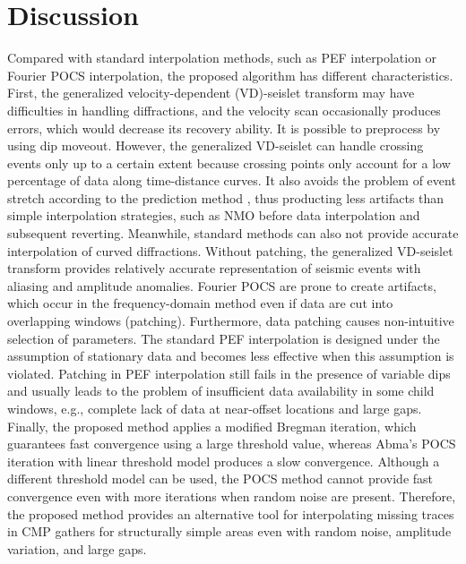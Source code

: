 
\section{Discussion}

Compared with standard interpolation methods, such as PEF
interpolation or Fourier POCS interpolation, the proposed algorithm
has different characteristics. First, the generalized
velocity-dependent (VD)-seislet transform may have difficulties in
handling diffractions, and the velocity scan occasionally produces
errors, which would decrease its recovery ability. It is possible to
preprocess by using dip moveout. However, the generalized VD-seislet
can handle crossing events only up to a certain extent because
crossing points only account for a low percentage of data along
time-distance curves. It also avoids the problem of event stretch
according to the prediction method \cite[]{Fomel10a}, thus producting
less artifacts than simple interpolation strategies, such as NMO
before data interpolation and subsequent reverting. Meanwhile,
standard methods can also not provide accurate interpolation of curved
diffractions. Without patching, the generalized VD-seislet transform
provides relatively accurate representation of seismic events with
aliasing and amplitude anomalies. Fourier POCS are prone to create
artifacts, which occur in the frequency-domain method even if data are
cut into overlapping windows (patching). Furthermore, data patching
causes non-intuitive selection of parameters. The standard PEF
interpolation is designed under the assumption of stationary data and
becomes less effective when this assumption is violated. Patching in
PEF interpolation still fails in the presence of variable dips and
usually leads to the problem of insufficient data availability in some
child windows, e.g., complete lack of data at near-offset locations
and large gaps. Finally, the proposed method applies a modified
Bregman iteration, which guarantees fast convergence using a large
threshold value, whereas Abma's POCS iteration with linear threshold
model produces a slow convergence. Although a different threshold
model \cite[]{Gao10} can be used, the POCS method cannot provide fast
convergence even with more iterations when random noise are
present. Therefore, the proposed method provides an alternative tool
for interpolating missing traces in CMP gathers for structurally
simple areas even with random noise, amplitude variation, and large
gaps.

